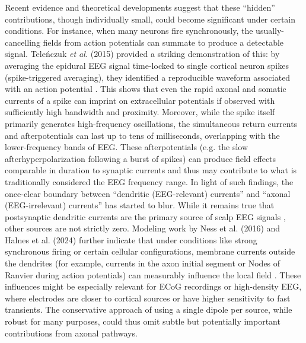 \documentclass[final, a4paper,masters,en,listoffigures,listoftables,norwegiandates]{NMBU}
\begin{document}
Recent evidence and theoretical developments suggest that these “hidden” contributions, though individually small, could become significant under certain conditions. For instance, when many neurons fire synchronously, the usually-cancelling fields from action potentials can summate to produce a detectable signal. Teleńczuk \textit{et al.} (2015) provided a striking demonstration of this: by averaging the epidural EEG signal time-locked to single cortical neuron spikes (spike-triggered averaging), they identified a reproducible waveform associated with an action potential \cite{Telenczuk2015}. This shows that even the rapid axonal and somatic currents of a spike can imprint on extracellular potentials if observed with sufficiently high bandwidth and proximity. Moreover, while the spike itself primarily generates high-frequency oscillations, the simultaneous return currents and afterpotentials can last up to tens of milliseconds, overlapping with the lower-frequency bands of EEG. These afterpotentials (e.g. the slow afterhyperpolarization following a burst of spikes) can produce field effects comparable in duration to synaptic currents and thus may contribute to what is traditionally considered the EEG frequency range. In light of such findings, the once-clear boundary between “dendritic (EEG-relevant) currents” and “axonal (EEG-irrelevant) currents” has started to blur. While it remains true that postsynaptic dendritic currents are the primary source of scalp EEG signals \cite{Buzsaki2012}, other sources are not strictly zero. Modeling work by Ness et al. (2016) and Halnes et al. (2024) further indicate that under conditions like strong synchronous firing or certain cellular configurations, membrane currents outside the dendrites (for example, currents in the axon initial segment or Nodes of Ranvier during action potentials) can measurably influence the local field \cite{ness2016subthreshold, Halnes2024ElectricBrainSignals}. These influences might be especially relevant for ECoG recordings or high-density EEG, where electrodes are closer to cortical sources or have higher sensitivity to fast transients. The conservative approach of using a single dipole per source, while robust for many purposes, could thus omit subtle but potentially important contributions from axonal pathways.
\end{document}
